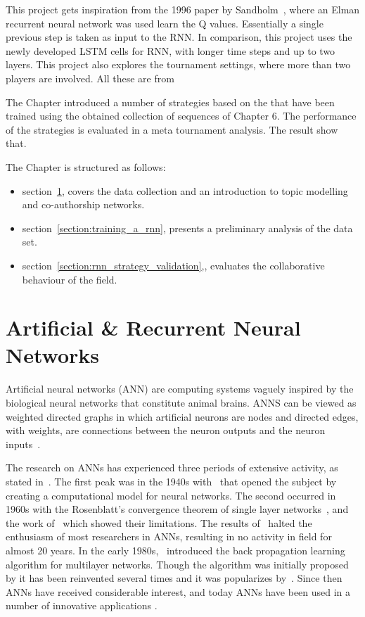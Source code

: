This project gets inspiration from the 1996 paper by Sandholm~\cite{Sandholm1996}, where an Elman
recurrent neural network was used learn the Q values. Essentially a single
previous step is taken as input to the RNN. In comparison, this project uses the
newly developed LSTM cells for RNN, with longer time steps and up to two layers.
This project also explores the tournament settings, where more than two players
are involved. All these are from~\cite{Wang20171}

The Chapter introduced a number of strategies based on the that have been trained
using the obtained collection of sequences of Chapter 6. The performance
of the strategies is evaluated in a meta tournament analysis. The result
show that.

The Chapter is structured as follows:

\begin{itemize}
    \item section~\ref{section:artificial_neural_networks}, covers the data collection and an introduction
    to topic modelling and co-authorship networks.
    \item section~\ref{section:training_a_rnn}, presents a preliminary analysis of the
    data set.
    \item section~\ref{section:rnn_strategy_validation},, evaluates the collaborative behaviour
    of the field.
\end{itemize}

\section{Artificial \& Recurrent Neural Networks}\label{section:artificial_neural_networks}

Artificial neural networks (ANN) are computing systems vaguely inspired by the
biological neural networks that constitute animal brains. ANNS can be viewed as
weighted directed graphs in which artificial neurons are nodes and directed
edges, with weights, are connections between the neuron outputs and the neuron
inputs~\cite{Jain1996}.

The research on ANNs has experienced three periods of extensive activity, as
stated in~\cite{Jain1996}. The first peak was in the 1940s
with~\cite{McCulloch1943} that opened the subject by creating a computational
model for neural networks. The second occurred in 1960s with the Rosenblatt's
convergence theorem of single layer networks~\cite{Rosenblatt1961}, and
the work of~\cite{Minsky1969} which showed their limitations.
The results of~\cite{Minsky1969} halted the enthusiasm of most
researchers in ANNs, resulting in no activity in field for almost 20 years. In
the early 1980s,~\cite{Werbos1974} introduced the back propagation learning
algorithm for multilayer networks. Though the algorithm was
initially proposed by it has been reinvented several times and it was
popularizes by~\cite{McClelland1986}. Since then ANNs have received considerable
interest, and today ANNs have been used in a number of innovative applications
\cite{Kalogirou2000, Covington2016}.

